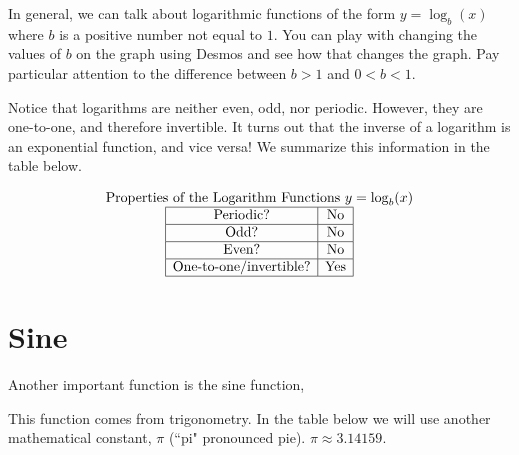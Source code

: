 \documentclass[nooutcomes]{ximera}
\begin{document}
In general, we can talk about logarithmic functions of the form $y=\log_b(x)$ where $b$ is a positive number not equal to $1$.  You can play with changing the values of $b$ on the graph using Desmos and see how that changes the graph.  Pay particular attention to the difference between $b>1$ and $0<b<1$.

\begin{center}  
\end{center}

Notice that logarithms are neither even, odd, nor periodic. However, they are one-to-one, and therefore invertible. It turns out that the inverse of a logarithm is an exponential function, and vice versa! We summarize this information in the table below.

\[
\begin{array}{ c  }
  \text{\normalfont Properties of the Logarithm Functions } y=\log_b(x)\\
 \begin{array}{|c|c|}
 \hline
\text{Periodic?} & \text{No} \\ \hline
\text{Odd?} & \text{No} \\ \hline
\text{Even?} & \text{No} \\ \hline
\text{One-to-one/invertible?} & \text{Yes} \\ \hline
 \end{array}
\end{array}
 \]


\newpage


\section{Sine}
Another important function is the sine function, 

\begin{center}
\end{center}



This function comes from trigonometry. In the table below we will use another mathematical constant, $\pi$ (``pi" pronounced pie). $\pi \approx 3.14159$.
\end{document}
